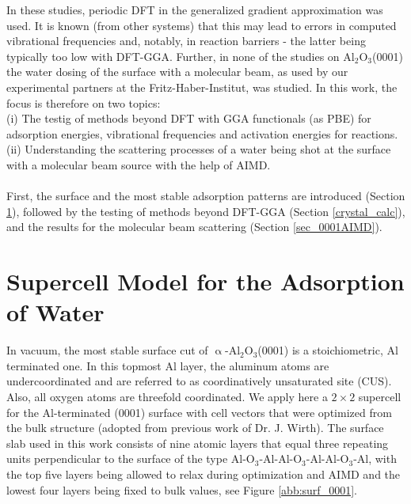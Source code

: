 \documentclass[11pt,DIV=13,BCOR=5mm,a4paper,headinclude]{scrbook}
\newcommand\todo[1]{\textcolor{red}{TODO: \textit{{#1}}}}
\begin{document}
In these studies, periodic DFT in the generalized gradient approximation was used.
It is known (from other systems) that this may lead to errors in computed vibrational frequencies and, notably, in reaction barriers - the latter being typically too low with DFT-GGA.
Further, in none of the studies on Al$_2$O$_3$(0001) the water dosing of the surface with a molecular beam, as used by our experimental partners at the Fritz-Haber-Institut, was studied.
In this work, the focus is therefore on two topics:
\\
(i) The testig of methods beyond DFT with GGA functionals (as PBE) for adsorption energies, vibrational frequencies and activation energies for reactions.
\\
(ii) Understanding the scattering processes of a water being shot at the surface with a molecular beam source with the help of AIMD.
\\\\
First, the surface and the most stable adsorption patterns are introduced (Section \ref{sec_0001surf}), followed by the testing of methods beyond DFT-GGA (Section \ref{crystal_calc}), and the results for the molecular beam scattering\cite{Heiden0001_2018} (Section \ref{sec_0001AIMD}).
	
\section{Supercell Model for the Adsorption of Water}\label{sec_0001surf}

In vacuum, the most stable surface cut of $\upalpha$-Al$_2$O$_3$(0001) is a stoichiometric, Al terminated one.
In this topmost Al layer, the aluminum atoms are undercoordinated and are referred to as coordinatively unsaturated site (CUS).
Also, all oxygen atoms are threefold coordinated. %
We apply here a $2\times 2$ supercell for the Al-terminated (0001) surface with cell vectors that were optimized from the bulk structure (adopted from previous work of Dr. J. Wirth\cite{WirthJPCC2012}).
The surface slab used in this work consists of nine atomic layers that equal three repeating units perpendicular to the surface of the type Al-O$_3$-Al-Al-O$_3$-Al-Al-O$_3$-Al, with the top five layers being allowed to relax during optimization and AIMD and the lowest four layers being fixed to bulk values, see Figure \ref{abb:surf_0001}.
\end{document}
